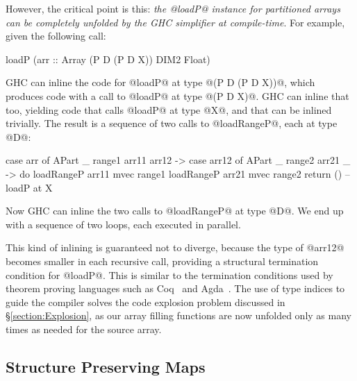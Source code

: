 However, the critical point is this: \emph{the @loadP@ instance for partitioned arrays can be completely unfolded by the GHC simplifier at compile-time}. For example, given the following call:
%
\begin{small}
\begin{code}
   loadP (arr :: Array (P D (P D X)) DIM2 Float)
\end{code}
\end{small}
%
GHC can inline the code for @loadP@ at type @(P D (P D X))@, which produces code with a call to @loadP@ at type @(P D X)@. GHC can inline that too, yielding code that calls @loadP@ at type @X@, and that can be inlined trivially.  The result is a sequence of two calls to @loadRangeP@, each at type @D@:
\par
\begin{small}
\begin{code}
  case arr   of { APart _  range1 arr11 arr12 ->
  case arr12 of { APart _  range2 arr21 _     ->
  do loadRangeP arr11 mvec range1
     loadRangeP arr21 mvec range2
     return ()  }}                 -- loadP at X 
\end{code}
\end{small}
%
Now GHC can inline the two calls to @loadRangeP@ at type @D@. We end up with a sequence of two loops, each executed in parallel.

This kind of inlining is guaranteed not to diverge, because the type of @arr12@ becomes smaller in each recursive
call, providing a structural termination condition for @loadP@. This is similar to the termination conditions used by
theorem proving languages such as Coq~\cite{Coq} and Agda~\cite{Norell:Agda}. The use of type indices to guide the compiler solves the code explosion problem discussed in \S\ref{section:Explosion}, as our array filling functions are now unfolded only as many times as needed for the source array.


\subsection{Structure Preserving Maps}
\label{section:Structured}

